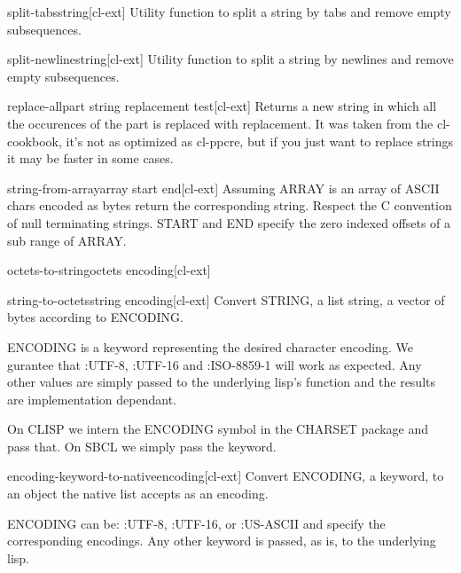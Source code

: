 \documentclass[10pt,english]{book}
\begin{document}
\begin{function}{split-tabs}{string}[cl-ext]
  Utility function to split a string by tabs and remove empty
  subsequences.
\end{function}

\begin{function}{split-newline}{string}[cl-ext]
  Utility function to split a string by newlines and remove empty
  subsequences.
\end{function}

\begin{function}{replace-all}{part string replacement \key test}[cl-ext]
  Returns a new string in which all the occurences of the part is
  replaced with replacement. It was taken from the cl-cookbook, it's
  not as optimized as cl-ppcre, but if you just want to replace
  strings it may be faster in some cases.
\end{function}

\begin{function}{string-from-array}{array \key start end}[cl-ext]
  Assuming ARRAY is an array of ASCII chars encoded as bytes return
the corresponding string. Respect the C convention of null terminating
strings. START and END specify the zero indexed offsets of a sub range
of ARRAY.
\end{function}

\begin{function}{octets-to-string}{octets encoding}[cl-ext]
  
\end{function}

\begin{function}{string-to-octets}{string encoding}[cl-ext]
  Convert STRING, a list string, a vector of bytes according to ENCODING.

ENCODING is a keyword representing the desired character
encoding. We gurantee that :UTF-8, :UTF-16 and :ISO-8859-1 will
work as expected. Any other values are simply passed to the
underlying lisp's function and the results are implementation
dependant.

On CLISP we intern the ENCODING symbol in the CHARSET package and
pass that. On SBCL we simply pass the keyword.
\end{function}

\begin{function}{encoding-keyword-to-native}{encoding}[cl-ext]
  Convert ENCODING, a keyword, to an object the native list
accepts as an encoding.

ENCODING can be: :UTF-8, :UTF-16, or :US-ASCII and specify the
corresponding encodings. Any other keyword is passed, as is, to
the underlying lisp.
\end{function}
\end{document}

